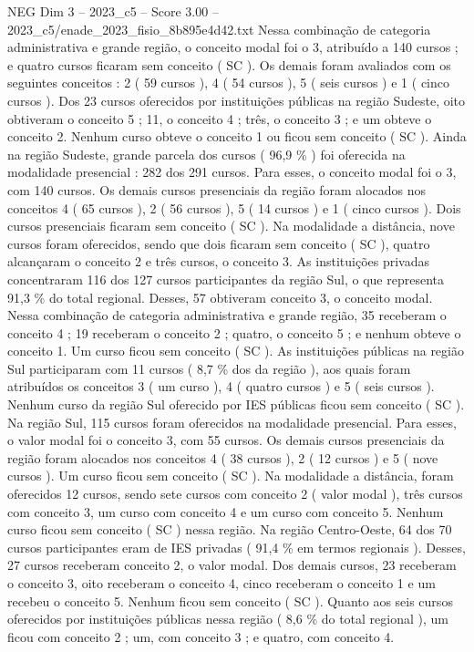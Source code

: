 \begin{textsample}{NEG Dim 3 – 2023\_c5 – Score 3.00 – 2023\_c5/enade\_2023\_fisio\_8b895e4d42.txt}
Nessa combinação de categoria administrativa e grande região, o conceito modal foi o 3, atribuído a 140 cursos ; e quatro cursos ficaram sem conceito ( SC ).
Os demais foram avaliados com os seguintes conceitos : 2 ( 59 cursos ), 4 ( 54 cursos ), 5 ( seis cursos ) e 1 ( cinco cursos ).
Dos 23 cursos oferecidos por instituições públicas na região Sudeste, oito obtiveram o conceito 5 ; 11, o conceito 4 ; três, o conceito 3 ; e um obteve o conceito 2.
Nenhum curso obteve o conceito 1 ou ficou sem conceito ( SC ).
Ainda na região Sudeste, grande parcela dos cursos ( 96,9 \% ) foi oferecida na modalidade presencial : 282 dos 291 cursos.
Para esses, o conceito modal foi o 3, com 140 cursos.
Os demais cursos presenciais da região foram alocados nos conceitos 4 ( 65 cursos ), 2 ( 56 cursos ), 5 ( 14 cursos ) e 1 ( cinco cursos ).
Dois cursos presenciais ficaram sem conceito ( SC ).
Na modalidade a distância, nove cursos foram oferecidos, sendo que dois ficaram sem conceito ( SC ), quatro alcançaram o conceito 2 e três cursos, o conceito 3.
As instituições privadas concentraram 116 dos 127 cursos participantes da região Sul, o que representa 91,3 \% do total regional.
Desses, 57 obtiveram conceito 3, o conceito modal.
Nessa combinação de categoria administrativa e grande região, 35 receberam o conceito 4 ; 19 receberam o conceito 2 ; quatro, o conceito 5 ; e nenhum obteve o conceito 1.
Um curso ficou sem conceito ( SC ).
As instituições públicas na região Sul participaram com 11 cursos ( 8,7 \% dos da região ), aos quais foram atribuídos os conceitos 3 ( um curso ), 4 ( quatro cursos ) e 5 ( seis cursos ).
Nenhum curso da região Sul oferecido por IES públicas ficou sem conceito ( SC ).
Na região Sul, 115 cursos foram oferecidos na modalidade presencial.
Para esses, o valor modal foi o conceito 3, com 55 cursos.
Os demais cursos presenciais da região foram alocados nos conceitos 4 ( 38 cursos ), 2 ( 12 cursos ) e 5 ( nove cursos ).
Um curso ficou sem conceito ( SC ).
Na modalidade a distância, foram oferecidos 12 cursos, sendo sete cursos com conceito 2 ( valor modal ), três cursos com conceito 3, um curso com conceito 4 e um curso com conceito 5.
Nenhum curso ficou sem conceito ( SC ) nessa região.
Na região Centro-Oeste, 64 dos 70 cursos participantes eram de IES privadas ( 91,4 \% em termos regionais ).
Desses, 27 cursos receberam conceito 2, o valor modal.
Dos demais cursos, 23 receberam o conceito 3, oito receberam o conceito 4, cinco receberam o conceito 1 e um recebeu o conceito 5.
Nenhum ficou sem conceito ( SC ).
Quanto aos seis cursos oferecidos por instituições públicas nessa região ( 8,6 \% do total regional ), um ficou com conceito 2 ; um, com conceito 3 ; e quatro, com conceito 4.

\end{textsample}
